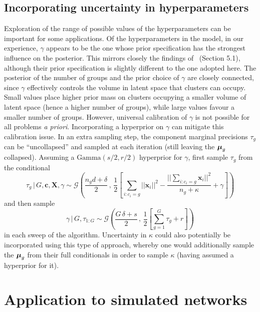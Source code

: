 \documentclass[12pt]{article}
\newcommand{\x}{{\mathbf{x}}}
\newcommand{\bX}{{\mathbf{X}}}
\newcommand{\bc}{{\mathbf{c}}}
\newcommand{\bfmu}{\hbox{\boldmath$\mu$}}
\begin{document}
\subsection{Incorporating uncertainty in hyperparameters} \label{sec:uncertainhp}

Exploration of the range of possible values of the hyperparameters can be important for some applications. Of the hyperparameters in the model, in our experience, $\gamma$ appears to be the one whose prior specification has the strongest influence on the posterior. This mirrors closely the findings of~ (Section 5.1), although their prior specification is slightly different to the one adopted here.  The posterior of the number of groups and the prior choice of $\gamma$ are closely connected, since $\gamma$ effectively controls the volume  in latent space that clusters can occupy. Small values place higher prior mass on clusters occupying a smaller volume of latent space (hence a higher number of groups), while large values favour a smaller number of groups. However, universal calibration of $\gamma$ is not possible for all problems {\it a priori}. Incorporating a hyperprior on $\gamma$ can mitigate this calibration issue. In an extra sampling step, the component marginal precisions $\tau_g$ can be ``uncollapsed'' and sampled at each iteration (still leaving the $\bfmu_g$ collapsed). Assuming a $\mbox{Gamma}(s/2,r/2)$ hyperprior for $\gamma$, first sample $\tau_g$ from the conditional
\[
\tau_g\, |\, G, \bc, \bX, \gamma \sim \mathcal{G}\left( \frac{n_g d + \delta}{2} \, , \, \frac{1}{2}\left[\sum_{i:c_i=g} || \x_i ||^2 - \frac{|| \sum_{i:c_i = g} \x_i ||^2}{n_g + \kappa}  + \gamma \right] \right)
\]
and then sample
\[
\gamma  \, | \, G, \tau_{1:G} \sim \mathcal{G}\left( \frac{G\, \delta + s}{2}\,,\,\frac{1}{2}\left[\sum_{g=1}^G \tau_g + r\right] \right)
\]
in each sweep of the algorithm. Uncertainty in $\kappa$ could also potentially be incorporated using this type of approach, whereby one would additionally sample the $\bfmu_g$ from their full conditionals in order to sample $\kappa$ (having assumed a hyperprior for it).
%

\section{Application to simulated networks} \label{sec:simulated}
\end{document}
